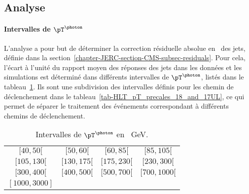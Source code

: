\subsection{Analyse}\label{chapter-JERC-section-JES-subsec-analyse}
\paragraph{Intervalles de $\pT^{\photon}$}
L'analyse a pour but de déterminer la correction résiduelle absolue en \pT\ des jets, définie dans la section~\ref{chapter-JERC-section-CMS-subsec-residuals}.
Pour cela, l'écart à l'unité du rapport moyen des réponses des jets dans les données et les simulations est déterminé dans différents intervalles de $\pT^{\photon}$, listés dans le tableau~\ref{tab-pT_photon_intervalles}.
Ils sont une subdivision des intervalles définis pour les chemin de déclenchement dans le tableau~\ref{tab-HLT_pT_precales_18_and_17UL}, ce qui permet de séparer le traitement des événements correspondant à différents chemins de déclenchement.
\begin{table}[h]
\centering
\begin{tabular}{cccc}
\toprule
$[\num{40}, \num{50}[$ & $[\num{50}, \num{60}[$ & $[\num{60}, \num{85}[$ & $[\num{85}, \num{105}[$ \\
$[\num{105}, \num{130}[$ & $[\num{130}, \num{175}[$ & $[\num{175}, \num{230}[$ & $[\num{230}, \num{300}[$ \\
$[\num{300}, \num{400}[$ & $[\num{400}, \num{500}[$ & $[\num{500}, \num{700}[$ & $[\num{700}, \num{1000}[$ \\
$[\num{1000}, \num{3000}]$ \\
\bottomrule
\end{tabular}
\caption[Intervalles de $\pT^{\photon}$.]{Intervalles de $\pT^{\photon}$ en \SI{}{\GeV}.}
\label{tab-pT_photon_intervalles}
\end{table}
